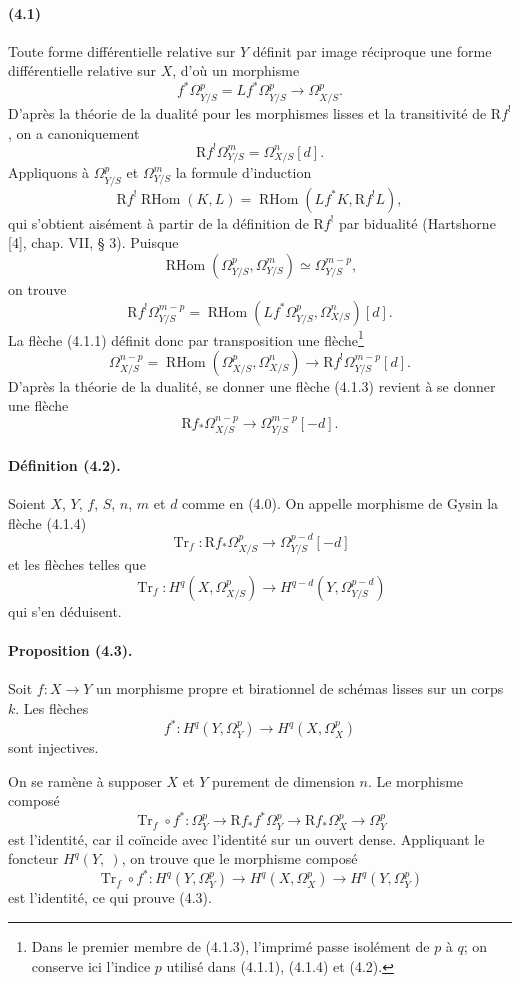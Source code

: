\documentclass[10pt]{article}
\newcommand{\R}{\mathrm R}
\providecommand{\Tr}{\operatorname{Tr}}
\providecommand{\RHom}{\operatorname{RHom}}
\begin{document}
\paragraph{(4.1)} Toute forme différentielle relative sur $Y$ définit par image réciproque une forme différentielle relative sur $X$, d'où un morphisme
\[
\tag{4.1.1}
f^*\Omega_{Y/S}^p=Lf^*\Omega_{Y/S}^p\longrightarrow\Omega_{X/S}^p.
\]
D'après la théorie de la dualité pour les morphismes lisses et la transitivité de $\R f^!$, on a canoniquement
\[
\tag{4.1.2}
\R f^!\Omega_{Y/S}^m=\Omega_{X/S}^n[d].
\]
Appliquons à $\Omega_{Y/S}^p$ et $\Omega_{Y/S}^m$ la formule d'induction
\[
\R f^!\RHom(K,L)=\RHom(Lf^*K,\R f^!L),
\]
qui s'obtient aisément à partir de la définition de $\R f^!$ par bidualité (Hartshorne [4], chap. VII, § 3). Puisque
\[
\RHom(\Omega_{Y/S}^p,\Omega_{Y/S}^m)\simeq\Omega_{Y/S}^{m-p},
\]
on trouve
\[
\R f^!\Omega_{Y/S}^{m-p}=\RHom(Lf^*\Omega_{Y/S}^p,\Omega_{X/S}^n)[d].
\]
La flèche (4.1.1) définit donc par transposition une flèche\footnote{Dans le premier membre de (4.1.3), l'imprimé passe isolément de $p$ à $q$; on conserve ici l'indice $p$ utilisé dans (4.1.1), (4.1.4) et (4.2).}
\[
\tag{4.1.3}
\Omega_{X/S}^{n-p}=\RHom(\Omega_{X/S}^p,\Omega_{X/S}^n)
\longrightarrow \R f^!\Omega_{Y/S}^{m-p}[d].
\]
D'après la théorie de la dualité, se donner une flèche (4.1.3) revient à se donner une flèche
\[
\tag{4.1.4}
\R f_*\Omega_{X/S}^{n-p}\longrightarrow \Omega_{Y/S}^{m-p}[-d].
\]

\paragraph{Définition (4.2).} Soient $X$, $Y$, $f$, $S$, $n$, $m$ et $d$ comme en (4.0). On appelle morphisme de Gysin la flèche (4.1.4)
\[
\Tr_f:\R f_*\Omega_{X/S}^p\longrightarrow\Omega_{Y/S}^{p-d}[-d]
\]
et les flèches telles que
\[
\Tr_f:H^q(X,\Omega_{X/S}^p)\longrightarrow H^{q-d}(Y,\Omega_{Y/S}^{p-d})
\]
qui s'en déduisent.

\paragraph{Proposition (4.3).} Soit $f:X\to Y$ un morphisme propre et birationnel de schémas lisses sur un corps $k$. Les flèches
\[
f^*:H^q(Y,\Omega_Y^p)\longrightarrow H^q(X,\Omega_X^p)
\]
sont injectives.

On se ramène à supposer $X$ et $Y$ purement de dimension $n$. Le morphisme composé
\[
\Tr_f\circ f^*:\Omega_Y^p\longrightarrow\R f_*f^*\Omega_Y^p\longrightarrow\R f_*\Omega_X^p\longrightarrow\Omega_Y^p
\]
est l'identité, car il coïncide avec l'identité sur un ouvert dense. Appliquant le foncteur $H^q(Y,\ )$, on trouve que le morphisme composé
\[
\Tr_f\circ f^*:H^q(Y,\Omega_Y^p)\longrightarrow H^q(X,\Omega_X^p)\longrightarrow H^q(Y,\Omega_Y^p)
\]
est l'identité, ce qui prouve (4.3).
\end{document}
